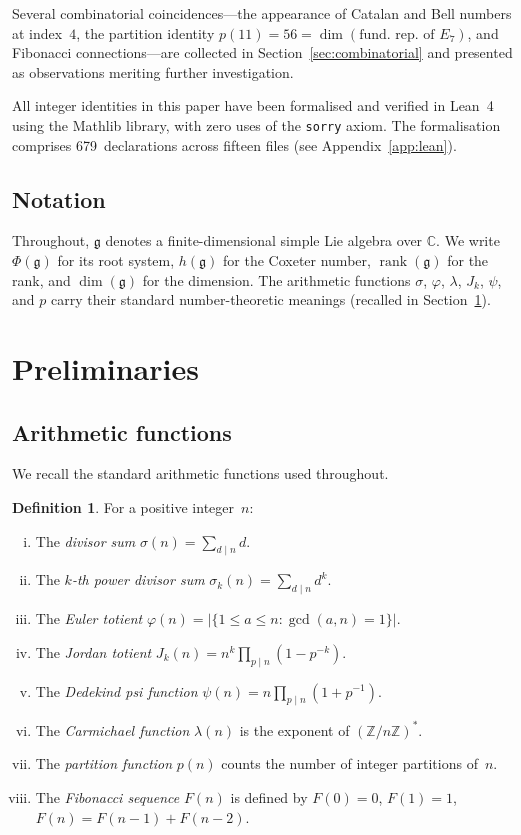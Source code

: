 \documentclass[11pt]{amsart}
\theoremstyle{plain}
\theoremstyle{definition}
\newtheorem{definition}[theorem]{Definition}
\theoremstyle{remark}
\newcommand{\fg}{\mathfrak{g}}
\renewcommand{\Phi}{\varPhi}
\newcommand{\rank}{\operatorname{rank}}
\begin{document}
Several combinatorial coincidences---the appearance of Catalan and Bell
numbers at index~$4$, the partition identity $p(11) = 56 = \dim(\text{fund.\ rep.\ of } E_7)$,
and Fibonacci connections---are collected in Section~\ref{sec:combinatorial}
and presented as observations meriting further investigation.

All integer identities in this paper have been formalised and verified
in Lean~4 using the Mathlib library, with zero uses of the \texttt{sorry}
axiom.  The formalisation comprises 679~declarations across fifteen files
(see Appendix~\ref{app:lean}).

\subsection*{Notation}
Throughout, $\fg$ denotes a finite-dimensional simple Lie algebra over
$\mathbb{C}$.  We write $\Phi(\fg)$ for its root system, $h(\fg)$ for
the Coxeter number, $\rank(\fg)$ for the rank, and $\dim(\fg)$ for the
dimension.  The arithmetic functions $\sigma$, $\varphi$, $\lambda$,
$J_k$, $\psi$, and $p$ carry their standard number-theoretic meanings
(recalled in Section~\ref{sec:prelim}).

\section{Preliminaries}\label{sec:prelim}

\subsection{Arithmetic functions}

We recall the standard arithmetic functions used throughout.

\begin{definition}\label{def:arith-funcs}
For a positive integer~$n$:
\begin{enumerate}[(i)]
  \item The \emph{divisor sum} $\sigma(n) = \sum_{d \mid n} d$.
  \item The \emph{$k$-th power divisor sum} $\sigma_k(n) = \sum_{d \mid n} d^k$.
  \item The \emph{Euler totient} $\varphi(n) = |\{1 \le a \le n : \gcd(a,n)=1\}|$.
  \item The \emph{Jordan totient} $J_k(n) = n^k \prod_{p \mid n}(1 - p^{-k})$.
  \item The \emph{Dedekind psi function} $\psi(n) = n \prod_{p \mid n}(1 + p^{-1})$.
  \item The \emph{Carmichael function} $\lambda(n)$ is the exponent of $(\mathbb{Z}/n\mathbb{Z})^*$.
  \item The \emph{partition function} $p(n)$ counts the number of integer partitions of~$n$.
  \item The \emph{Fibonacci sequence} $F(n)$ is defined by $F(0)=0$, $F(1)=1$, $F(n)=F(n-1)+F(n-2)$.
\end{enumerate}
\end{definition}
\end{document}
